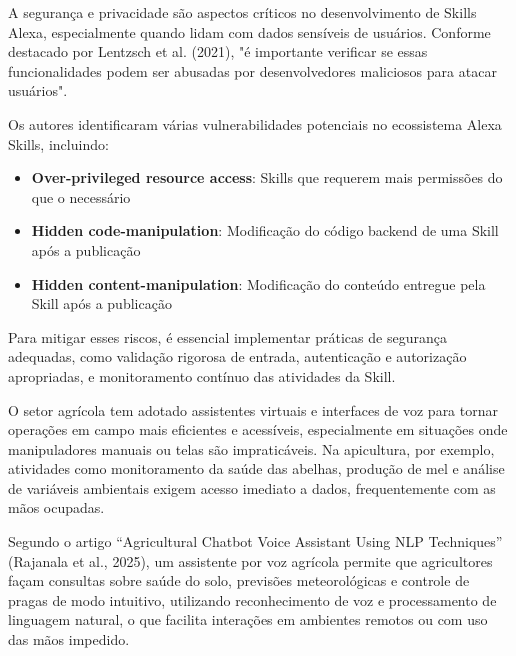 
A segurança e privacidade são aspectos críticos no desenvolvimento de Skills Alexa, especialmente quando lidam com dados sensíveis de usuários. 
Conforme destacado por Lentzsch et al. (2021), "é importante verificar se essas funcionalidades podem ser abusadas por desenvolvedores maliciosos para atacar usuários".

Os autores identificaram várias vulnerabilidades potenciais no ecossistema Alexa Skills, incluindo:
\begin{itemize}
    \item \textbf{Over-privileged resource access}: Skills que requerem mais permissões do que o necessário
    \item \textbf{Hidden code-manipulation}: Modificação do código backend de uma Skill após a publicação
    \item \textbf{Hidden content-manipulation}: Modificação do conteúdo entregue pela Skill após a publicação
\end{itemize}

Para mitigar esses riscos, é essencial implementar práticas de segurança adequadas, como validação rigorosa de entrada, 
autenticação e autorização apropriadas, e monitoramento contínuo das atividades da Skill.



O setor agrícola tem adotado assistentes virtuais e interfaces de voz para tornar operações em campo mais eficientes e acessíveis, especialmente em situações onde manipuladores manuais ou telas são impraticáveis. Na apicultura, por exemplo, atividades como monitoramento da saúde das abelhas, produção de mel e análise de variáveis ambientais exigem acesso imediato a dados, frequentemente com as mãos ocupadas.

Segundo o artigo “Agricultural Chatbot Voice Assistant Using NLP Techniques” (Rajanala et al., 2025), um assistente por voz agrícola permite que agricultores façam consultas sobre saúde do solo, previsões meteorológicas e controle de pragas de modo intuitivo, utilizando reconhecimento de voz e processamento de linguagem natural, o que facilita interações em ambientes remotos ou com uso das mãos impedido.


